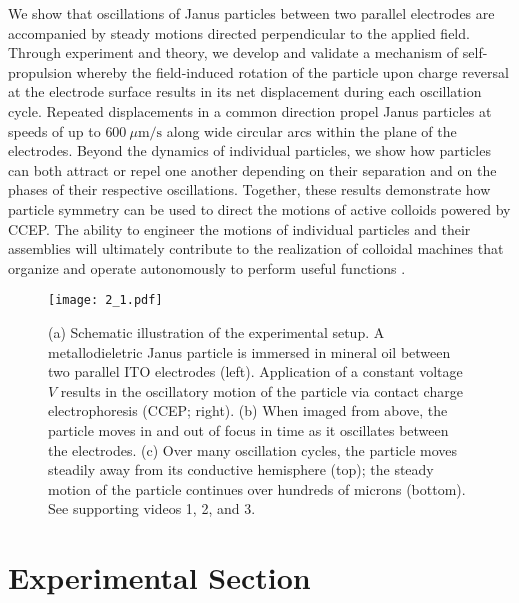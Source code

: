 We show that oscillations of Janus particles between two parallel electrodes are accompanied by steady motions directed perpendicular to the applied field.
Through experiment and theory, we develop and validate a mechanism of self-propulsion whereby the field-induced rotation of the particle upon charge reversal at the electrode surface results in its net displacement during each oscillation cycle.
Repeated displacements in a common direction propel Janus particles at speeds of up to $600~\mu\text{m/s}$ along wide circular arcs within the plane of the electrodes.
Beyond the dynamics of individual particles, we show how particles can both attract or repel one another depending on their separation and on the phases of their respective oscillations.
Together, these results demonstrate how particle symmetry can be used to direct the motions of active colloids powered by CCEP.
The ability to engineer the motions of individual particles and their assemblies will ultimately contribute to the realization of colloidal machines that organize and operate autonomously to perform useful functions \cite{Spellings2015}.

\begin{figure}[p]
\centering
\texttt{[image: 2\_1.pdf]}
\caption{ (a) Schematic illustration of the experimental setup. A metallodieletric Janus particle is immersed in mineral oil between two parallel ITO electrodes (left).  Application of a constant voltage $V$ results in the oscillatory motion of the particle via contact charge electrophoresis (CCEP; right). (b) When imaged from above, the particle moves in and out of focus in time as it oscillates between the electrodes. (c) Over many oscillation cycles, the particle moves steadily away from its conductive hemisphere (top); the steady motion of the particle continues over hundreds of microns (bottom).  See supporting videos 1, 2, and 3.}
\label{fig:1}
\end{figure}
 
 
\section{Experimental Section}

